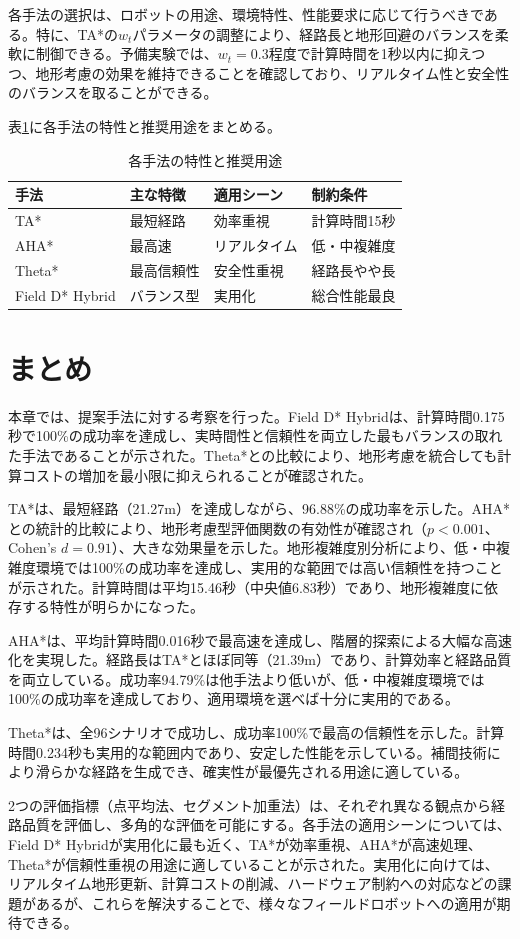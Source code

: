 各手法の選択は、ロボットの用途、環境特性、性能要求に応じて行うべきである。特に、TA*の$w_t$パラメータの調整により、経路長と地形回避のバランスを柔軟に制御できる。予備実験では、$w_t=0.3$程度で計算時間を1秒以内に抑えつつ、地形考慮の効果を維持できることを確認しており、リアルタイム性と安全性のバランスを取ることができる。

表\ref{tab:method_selection}に各手法の特性と推奨用途をまとめる。

\begin{table}[htbp]
\centering
\caption{各手法の特性と推奨用途}
\label{tab:method_selection}
\begin{tabular}{llll}
\hline
手法 & 主な特徴 & 適用シーン & 制約条件 \\
\hline
TA* & 最短経路 & 効率重視 & 計算時間15秒 \\
AHA* & 最高速 & リアルタイム & 低・中複雑度 \\
Theta* & 最高信頼性 & 安全性重視 & 経路長やや長 \\
Field D* Hybrid & バランス型 & 実用化 & 総合性能最良 \\
\hline
\end{tabular}
\end{table}

\section{まとめ}

本章では、提案手法に対する考察を行った。Field D* Hybridは、計算時間0.175秒で100\%の成功率を達成し、実時間性と信頼性を両立した最もバランスの取れた手法であることが示された。Theta*との比較により、地形考慮を統合しても計算コストの増加を最小限に抑えられることが確認された。

TA*は、最短経路（21.27m）を達成しながら、96.88\%の成功率を示した。AHA*との統計的比較により、地形考慮型評価関数の有効性が確認され（$p<0.001$、Cohen's $d=0.91$）、大きな効果量を示した。地形複雑度別分析により、低・中複雑度環境では100\%の成功率を達成し、実用的な範囲では高い信頼性を持つことが示された。計算時間は平均15.46秒（中央値6.83秒）であり、地形複雑度に依存する特性が明らかになった。

AHA*は、平均計算時間0.016秒で最高速を達成し、階層的探索による大幅な高速化を実現した。経路長はTA*とほぼ同等（21.39m）であり、計算効率と経路品質を両立している。成功率94.79\%は他手法より低いが、低・中複雑度環境では100\%の成功率を達成しており、適用環境を選べば十分に実用的である。

Theta*は、全96シナリオで成功し、成功率100\%で最高の信頼性を示した。計算時間0.234秒も実用的な範囲内であり、安定した性能を示している。補間技術により滑らかな経路を生成でき、確実性が最優先される用途に適している。

2つの評価指標（点平均法、セグメント加重法）は、それぞれ異なる観点から経路品質を評価し、多角的な評価を可能にする。各手法の適用シーンについては、Field D* Hybridが実用化に最も近く、TA*が効率重視、AHA*が高速処理、Theta*が信頼性重視の用途に適していることが示された。実用化に向けては、リアルタイム地形更新、計算コストの削減、ハードウェア制約への対応などの課題があるが、これらを解決することで、様々なフィールドロボットへの適用が期待できる。
